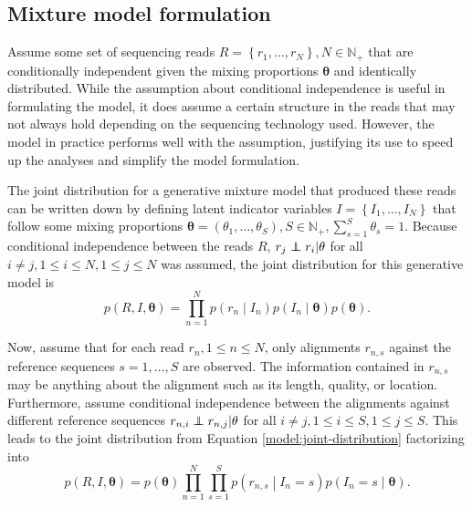 \documentclass[officiallayout]{tktla}
\newcommand\indept{\protect\mathpalette{\protect\independenT}{\perp}}
\def\independenT#1#2{\mathrel{\rlap{$#1#2$}\mkern2mu{#1#2}}}
\begin{document}
\subsection{Mixture model formulation}
Assume some set of sequencing reads $R = \left\{r_{1}, \dots,
r_{N}\right\}, N \in \mathbb{N}_{+}$ that are conditionally
independent given the mixing proportions $\mathbf{\theta}$ and
identically distributed. While the assumption about conditional
independence is useful in formulating the model, it does assume a
certain structure in the reads that may not always hold depending on
the sequencing technology used. However, the model in practice
performs well with the assumption, justifying its use to speed up the
analyses and simplify the model formulation.

The joint distribution for a generative mixture model that produced
these reads can be written down by defining latent indicator variables
$I = \left\{I_{1}, \dots, I_{N}\right\}$ that follow some mixing
proportions $\boldsymbol{\theta} = \left(\theta_{1}, \dots,
\theta_{S}\right), S \in \mathbb{N}_{+}, \sum_{s = 1}^{S} \theta_{s} =
1$. Because conditional independence between the reads $R$, $r_{j}
\indept r_{i} | \mathbf{\theta}$ for all $i \neq j, 1 \leq i \leq N, 1
\leq j \leq N$ was assumed, the joint distribution for this generative
model is
\begin{equation}
  \label{model:joint-distribution}
  p\left(R, I, \boldsymbol\theta\right) = \prod_{n = 1}^{N}p\left(r_{n} \middle| I_{n}\right) p\left(I_{n} \middle| \boldsymbol\theta\right)p\left(\boldsymbol\theta\right).
\end{equation}

Now, assume that for each read $r_{n}, 1 \leq n \leq N$, only alignments
$r_{n, s}$ against the reference sequences $s = 1, \dots, S$ are
observed. The information contained in $r_{n, s}$ may be anything
about the alignment such as its length, quality, or
location. Furthermore, assume conditional independence between the
alignments against different reference sequences $r_{n, i} \indept
r_{n, j} | \mathbf{\theta}$ for all $i \neq j, 1 \leq i \leq S, 1 \leq
j \leq S$. This leads to the joint distribution from Equation
\ref{model:joint-distribution} factorizing into
\begin{equation}
  \label{model:joint-distribution-factorized}
  p\left(R, I, \boldsymbol\theta\right) = p\left(\boldsymbol\theta\right)\prod_{n = 1}^{N} \prod_{s = 1}^{S} p\left(r_{n, s} \middle| I_{n} = s\right) p\left(I_{n} = s \middle| \boldsymbol\theta\right).
\end{equation}
\end{document}
